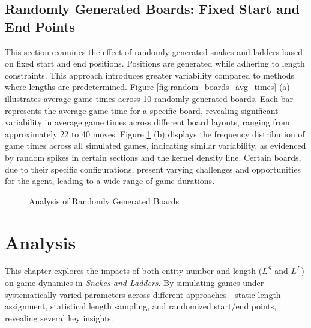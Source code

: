 \documentclass[12pt]{report}
\begin{document}
	
	\subsection{Randomly Generated Boards: Fixed Start and End Points}
	
	This section examines the effect of randomly generated snakes and ladders based on fixed start and end positions. Positions are generated while adhering to length constraints. This approach introduces greater variability compared to methods where lengths are predetermined. Figure \ref{fig:random_boards_avg_times} (a) illustrates average game times across 10 randomly generated boards. Each bar represents the average game time for a specific board, revealing significant variability in average game times across different board layouts, ranging from approximately 22 to 40 moves. Figure \ref{fig:random_boards_game_dist} (b) displays the frequency distribution of game times across all simulated games, indicating similar variability, as evidenced by random spikes in certain sections and the kernel density line. Certain boards, due to their specific configurations, present varying challenges and opportunities for the agent, leading to a wide range of game durations.
	
	\begin{figure}[ht]
		\centering
		\caption{Analysis of Randomly Generated Boards}
		\label{fig:random_boards_avg_times}
		\label{fig:random_boards_game_dist}
	\end{figure}
	
	
	\section{Analysis}
	
	This chapter explores the impacts of both entity number and length ($L^S$ and $L^L$) on game dynamics in \textit{Snakes and Ladders}. By simulating games under systematically varied parameters across different approaches—static length assignment, statistical length sampling, and randomized start/end points, revealing several key insights.
	
\end{document}

